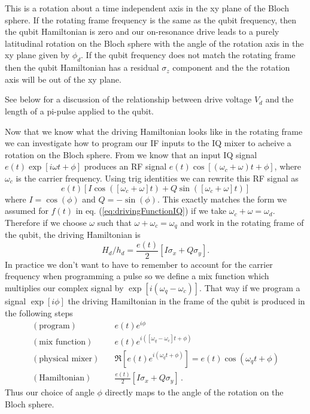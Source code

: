 This is a rotation about a time independent axis in the xy plane of the Bloch sphere.
If the rotating frame frequency is the same as the qubit frequency, then the qubit Hamiltonian is zero and our on-resonance drive leads to a purely latitudinal rotation on the Bloch sphere with the angle of the rotation axis in the xy plane given by $\phi_d$.
If the qubit frequency does not match the rotating frame then the qubit Hamiltonian has a residual $\sigma_z$ component and the the rotation axis will be out of the xy plane.

See below for a discussion of the relationship between drive voltage $V_d$ and the length of a pi-pulse applied to the qubit.


Now that we know what the driving Hamiltonian looks like in the rotating frame we can investigate how to program our IF inputs to the IQ mixer to acheive a rotation on the Bloch sphere.
From  we know that an input IQ signal $e(t)\exp\left[i\omega t + \phi\right]$ produces an RF signal $ e(t)\cos\left[(\omega_c+\omega)t + \phi \right]$, where $\omega_c$ is the carrier frequency. Using trig identities we can rewrite this RF signal as \begin{equation}
e(t) \left[ I\cos(\left[\omega_c+\omega\right] t) + Q\sin(\left[\omega_c+\omega\right]t)\right] \nonumber \end{equation}
where $I=\cos(\phi)$ and $Q=-\sin(\phi)$.
This exactly matches the form we assumed for $f(t)$ in eq. (\ref{eq:drivingFunctionIQ}) if we take $\omega_c + \omega = \omega_d$.
Therefore if we choose $\omega$ such that $\omega + \omega_c = \omega_q$ and work in the rotating frame of the qubit, the driving Hamiltonian is \begin{equation}
H_d/h_d = \frac{e(t)}{2}\left[I\sigma_x + Q\sigma_y\right]. \end{equation}
In practice we don't want to have to remember to account for the carrier frequency when programming a pulse so we define a mix function which multiplies our complex signal by $\exp\left[i(\omega_{q} - \omega_c)\right]$.
That way if we program a signal $\exp\left[i\phi\right]$ the driving Hamiltonian in the frame of the qubit is produced in the following steps
\begin{align*}
  (\text{program}) & \quad e(t) e^{i\phi} \\
  (\text{mix function}) & \quad e(t) e^{i([\omega_q-\omega_c]t + \phi)} \\
  (\text{physical mixer}) & \quad \Re \left[ e(t) e^{i(\omega_q t + \phi)} \right] = e(t) \cos\left(\omega_q t + \phi \right) \\
  (\text{Hamiltonian}) & \quad \frac{e(t)}{2}\left[ I \sigma_x + Q \sigma_y \right] \, .
\end{align*}
Thus our choice of angle $\phi$ directly maps to the angle of the rotation on the Bloch sphere.

